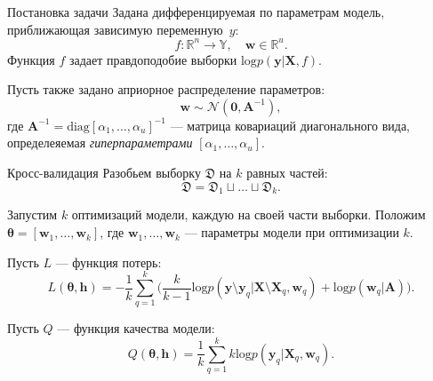 \documentclass[10pt,pdf,utf8,russian,aspectratio=169]{beamer}
\begin{document}
\begin{frame}{Постановка задачи}
Задана дифференцируемая по параметрам модель, приближающая зависимую переменную~$y$:
\[
	f:\mathbb{R}^n \to \mathbb{Y}, \quad \mathbf{w} \in \mathbb{R}^u.
\]
Функция $f$ задает правдоподобие выборки $\text{log}p(\mathbf{y}|\mathbf{X}, f)$. 

Пусть также задано априорное распределение параметров: $$\mathbf{w} \sim \mathcal{N}(\mathbf{0}, \mathbf{A}^{-1}),$$
где $\mathbf{A}^{-1} = \text{diag}[\alpha_1, \dots, \alpha_u]^{-1}$ --- матрица ковариаций диагонального вида, определеяемая \textit{гиперпараметрами} $[\alpha_1, \dots, \alpha_u]$.
\end{frame}
\begin{frame}{Кросс-валидация}
Разобьем выборку $\mathfrak{D}$ на $k$ равных частей:
\[
\mathfrak{D} = \mathfrak{D}_1 \sqcup \dots \sqcup \mathfrak{D}_k.
\]


Запустим $k$ оптимизаций модели, каждую на своей части выборки. Положим $\boldsymbol{\theta} = [\mathbf{w}_1, \dots, \mathbf{w}_k]$, где $\mathbf{w}_1, \dots, \mathbf{w}_k$ --- параметры модели при оптимизации $k$.
 
Пусть $L$ --- функция потерь:
\begin{equation}
\label{eq:cv}
L(\boldsymbol{\theta}, \mathbf{h}) = -\frac{1}{k}\sum_{q=1}^k \bigl(\frac{k}{k-1}\text{log}p(\mathbf{y} \setminus \mathbf{y}_q|\mathbf{X}\setminus \mathbf{X}_q, \mathbf{w}_q) + \text{log}p(\mathbf{w}_q|\mathbf{A})\bigr).
\end{equation}

Пусть $Q$ --- функция качества модели:
\[
Q(\boldsymbol{\theta}, \mathbf{h}) = \frac{1}{k}\sum_{q=1}^k k\text{log}p(\mathbf{y}_q|\mathbf{X}_q, \mathbf{w}_q).
\]

\end{frame}
\end{document}
